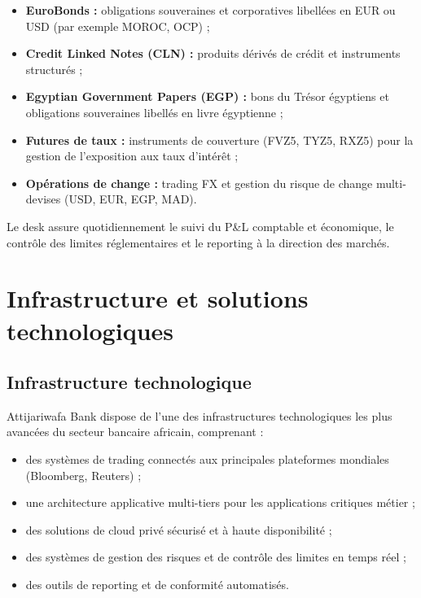 \begin{itemize}
    \item \textbf{EuroBonds :} obligations souveraines et corporatives libellées en EUR ou USD (par exemple MOROC, OCP) ;
    \item \textbf{Credit Linked Notes (CLN) :} produits dérivés de crédit et instruments structurés ;
    \item \textbf{Egyptian Government Papers (EGP) :} bons du Trésor égyptiens et obligations souveraines libellés en livre égyptienne ;
    \item \textbf{Futures de taux :} instruments de couverture (FVZ5, TYZ5, RXZ5) pour la gestion de l'exposition aux taux d'intérêt ;
    \item \textbf{Opérations de change :} trading FX et gestion du risque de change multi-devises (USD, EUR, EGP, MAD).
\end{itemize}

\hspace{1cm} Le desk assure quotidiennement le suivi du P\&L comptable et économique, le contrôle des limites réglementaires et le reporting à la direction des marchés.

\section{Infrastructure et solutions technologiques}

\subsection{Infrastructure technologique}

\hspace{1cm} Attijariwafa Bank dispose de l'une des infrastructures technologiques les plus avancées du secteur bancaire africain, comprenant :

\begin{itemize}
    \item des systèmes de trading connectés aux principales plateformes mondiales (Bloomberg, Reuters) ;
    \item une architecture applicative multi-tiers pour les applications critiques métier ;
    \item des solutions de cloud privé sécurisé et à haute disponibilité ;
    \item des systèmes de gestion des risques et de contrôle des limites en temps réel ;
    \item des outils de reporting et de conformité automatisés.
\end{itemize}

